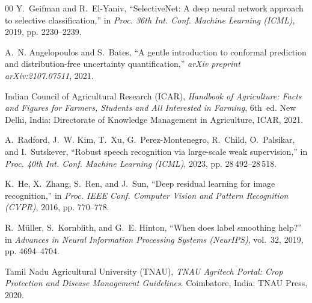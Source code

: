 \documentclass[conference]{IEEEtran}
\begin{document}
\begin{thebibliography}{00}
Y.~Geifman and R.~El-Yaniv, ``SelectiveNet: A deep neural network approach to selective classification,'' in \emph{Proc. 36th Int. Conf. Machine Learning (ICML)}, 2019, pp. 2230--2239.

A.~N. Angelopoulos and S.~Bates, ``A gentle introduction to conformal prediction and distribution-free uncertainty quantification,'' \emph{arXiv preprint arXiv:2107.07511}, 2021.

Indian Council of Agricultural Research (ICAR), \emph{Handbook of Agriculture: Facts and Figures for Farmers, Students and All Interested in Farming}, 6th~ed. New Delhi, India: Directorate of Knowledge Management in Agriculture, ICAR, 2021.

A.~Radford, J.~W. Kim, T.~Xu, G.~Perez-Montenegro, R.~Child, O.~Palsikar, and I.~Sutskever, ``Robust speech recognition via large-scale weak supervision,'' in \emph{Proc. 40th Int. Conf. Machine Learning (ICML)}, 2023, pp. 28\,492--28\,518.

K.~He, X.~Zhang, S.~Ren, and J.~Sun, ``Deep residual learning for image recognition,'' in \emph{Proc. IEEE Conf. Computer Vision and Pattern Recognition (CVPR)}, 2016, pp. 770--778.

R.~M{\"u}ller, S.~Kornblith, and G.~E. Hinton, ``When does label smoothing help?'' in \emph{Advances in Neural Information Processing Systems (NeurIPS)}, vol.~32, 2019, pp. 4694--4704.

Tamil Nadu Agricultural University (TNAU), \emph{TNAU Agritech Portal: Crop Protection and Disease Management Guidelines}. Coimbatore, India: TNAU Press, 2020.

\end{thebibliography}
\end{document}

